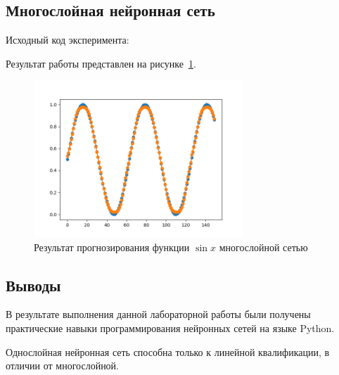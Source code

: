 \subsection{Многослойная нейронная сеть}
Исходный код эксперимента:  
 

Результат работы представлен на рисунке~\ref{fig:multi_layer_result}.

\begin{figure}[H]
    \centering
        \includegraphics[width=0.7\textwidth]{multi_layer_result}
    \caption{Результат прогнозирования функции $\sin x$ многослойной сетью}
    \label{fig:multi_layer_result}
\end{figure}

\subsection*{Выводы}
В результате выполнения данной лабораторной работы были получены практические навыки программирования нейронных сетей на языке Python.

Однослойная нейронная сеть способна только к линейной квалификации, в отличии от многослойной.


